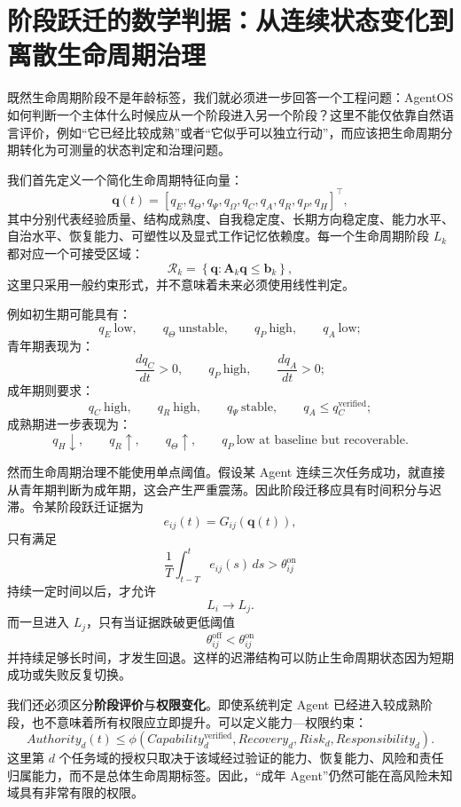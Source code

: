\section{阶段跃迁的数学判据：从连续状态变化到离散生命周期治理}

既然生命周期阶段不是年龄标签，我们就必须进一步回答一个工程问题：AgentOS 如何判断一个主体什么时候应从一个阶段进入另一个阶段？这里不能仅依靠自然语言评价，例如“它已经比较成熟”或者“它似乎可以独立行动”，而应该把生命周期分期转化为可测量的状态判定和治理问题。

我们首先定义一个简化生命周期特征向量：
\[
\mathbf q(t)
=
[
q_E,
q_\Theta,
q_\Psi,
q_\Omega,
q_C,
q_A,
q_R,
q_P,
q_H
]^\top,
\]
其中分别代表经验质量、结构成熟度、自我稳定度、长期方向稳定度、能力水平、自治水平、恢复能力、可塑性以及显式工作记忆依赖度。每一个生命周期阶段 $L_k$ 都对应一个可接受区域：
\[
\mathcal R_k
=
\left\{
\mathbf q:
\mathbf A_k\mathbf q
\leq
\mathbf b_k
\right\},
\]
这里只采用一般约束形式，并不意味着未来必须使用线性判定。

例如初生期可能具有：
\[
q_E\ \text{low},
\qquad
q_\Theta\ \text{unstable},
\qquad
q_P\ \text{high},
\qquad
q_A\ \text{low};
\]
青年期表现为：
\[
\frac{dq_C}{dt}>0,
\qquad
q_P\ \text{high},
\qquad
\frac{dq_A}{dt}>0;
\]
成年期则要求：
\[
q_C\ \text{high},
\qquad
q_R\ \text{high},
\qquad
q_\Psi\ \text{stable},
\qquad
q_A\leq q_C^{\mathrm{verified}};
\]
成熟期进一步表现为：
\[
q_H\downarrow,
\qquad
q_R\uparrow,
\qquad
q_\Theta\uparrow,
\qquad
q_P\ \text{low at baseline but recoverable}.
\]

然而生命周期治理不能使用单点阈值。假设某 Agent 连续三次任务成功，就直接从青年期判断为成年期，这会产生严重震荡。因此阶段迁移应具有时间积分与迟滞。令某阶段跃迁证据为
\[
e_{ij}(t)
=
G_{ij}(\mathbf q(t)),
\]
只有满足
\[
\frac{1}{T}
\int_{t-T}^{t}
e_{ij}(s)\,ds
>
\theta_{ij}^{\mathrm{on}}
\]
持续一定时间以后，才允许
\[
L_i\rightarrow L_j.
\]
而一旦进入 $L_j$，只有当证据跌破更低阈值
\[
\theta_{ij}^{\mathrm{off}}
<
\theta_{ij}^{\mathrm{on}}
\]
并持续足够长时间，才发生回退。这样的迟滞结构可以防止生命周期状态因为短期成功或失败反复切换。

我们还必须区分\textbf{阶段评价}与\textbf{权限变化}。即使系统判定 Agent 已经进入较成熟阶段，也不意味着所有权限应立即提升。可以定义能力—权限约束：
\[
Authority_d(t)
\leq
\phi
\left(
Capability_d^{\mathrm{verified}},
Recovery_d,
Risk_d,
Responsibility_d
\right).
\]
这里第 $d$ 个任务域的授权只取决于该域经过验证的能力、恢复能力、风险和责任归属能力，而不是总体生命周期标签。因此，“成年 Agent”仍然可能在高风险未知域具有非常有限的权限。

